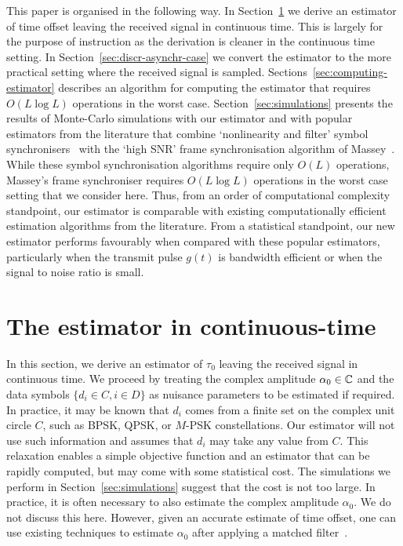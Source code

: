\documentclass[journal]{IEEEtranTCOM}
\begin{document}
This paper is organised in the following way.  In Section~\ref{sec:cont-asynchr-case} we derive an estimator of time offset leaving the received signal in continuous time.  This is largely for the purpose of instruction as the derivation is cleaner in the continuous time setting.  In Section~\ref{sec:discr-asynchr-case} we convert the estimator to the more practical setting where the received signal is sampled. Sections~\ref{sec:computing-estimator} describes an algorithm for computing the estimator that requires $O(L\log L)$ operations in the worst case.  Section~\ref{sec:simulations} presents the results of Monte-Carlo simulations with our estimator 
and with popular estimators from the literature that combine `nonlinearity and filter' symbol synchronisers~\cite{Oerder_synch_square_circstat_1988,Panayirci_eval_per_symbtim_1996} with the `high SNR' frame synchronisation algorithm of Massey~\cite{Massey1972optimumframe}\cite[Equation 3.29]{Robertson_frame_sync_phd_1995}.  While these symbol synchronisation algorithms require only $O(L)$ operations, Massey's frame synchroniser requires $O(L\log L)$ operations in the worst case setting that we consider here.  Thus, from an order of computational complexity standpoint, our estimator is comparable with existing computationally efficient estimation algorithms from the literature.  From a statistical standpoint, our new estimator performs favourably when compared with these popular estimators, particularly when the transmit pulse $g(t)$ is bandwidth efficient or when the signal to noise ratio is small.

\section{The estimator in continuous-time}\label{sec:cont-asynchr-case}

In this section, we derive an estimator of $\tau_0$ leaving the received signal in continuous time.    We proceed by treating the complex amplitude $\alpha_0 \in {\mathbb C}$ and the data symbols $\{d_i \in C, i \in D\}$ as nuisance parameters to be estimated if required.  In practice, it may be known that $d_i$ comes from a finite set on the complex unit circle $C$, such as BPSK, QPSK, or $M$-PSK constellations.  Our estimator will not use such information and assumes that $d_i$ may take any value from $C$.  This relaxation enables a simple objective function and an estimator that can be rapidly computed, but may come with some statistical cost.  The simulations we perform in Section~\ref{sec:simulations} suggest that the cost is not too large.  In practice, it is often necessary to also estimate the complex amplitude $\alpha_0$.  We do not discuss this here.  However, given an accurate estimate of time offset, one can use existing techniques to estimate $\alpha_0$ after applying a matched filter~\cite{Mackenthun1994,Sweldens2001,McKilliam_leastsqPSKpilotsdata_2012,McKilliam_leastsqPSKnoncoICASSP_2012,ViterbiViterbi_phase_est_1983}.
\end{document}
